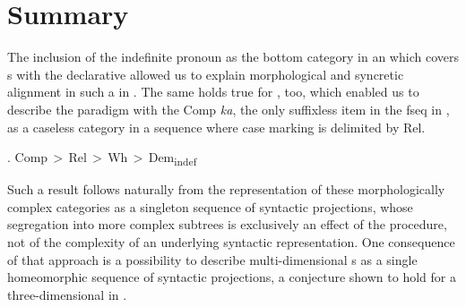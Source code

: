 \begin{center}
\end{center}


 
\section{Summary}

The inclusion of the indefinite  pronoun as the bottom category in an  which covers s with the declarative  allowed us to explain morphological  and syncretic alignment in such a  in . The same holds true for , too, which enabled us to describe the paradigm with the Comp \textit{ka}, the only suffixless item in  the fseq in \Next,  as a caseless category in a sequence where case marking is delimited by Rel. 

\ex. Comp\,$>$\,Rel\,$>$\,Wh\,$>$\,Dem\textsubscript{indef}

\noindent
Such a result follows naturally from the representation of these morphologically complex categories as a singleton sequence of syntactic projections, whose segregation into more complex subtrees is exclusively an effect of the  procedure, not of the complexity of an underlying syntactic representation.
One consequence of that approach is a possibility to describe multi-dimensional s as a single homeomorphic sequence of syntactic projections, a conjecture shown to hold for a three-dimensional  in .



